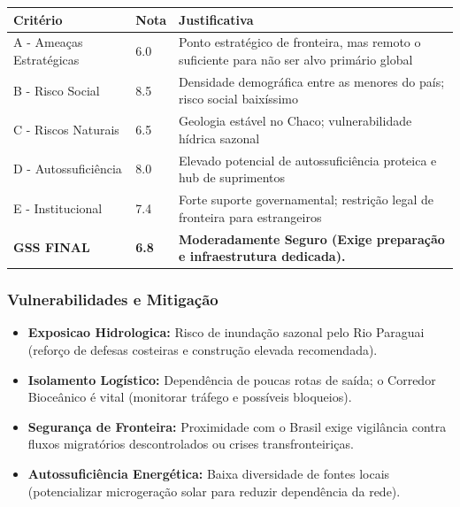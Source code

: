 \begin{table}[ht!]
\small \begin{tabular}{p{3.0cm}p{0.8cm}p{6.0cm}} \toprule
\textbf{Critério} & \textbf{Nota} & \textbf{Justificativa} \\ \midrule
A - Ameaças Estratégicas & 6.0 & Ponto estratégico de fronteira, mas remoto o suficiente para não ser alvo primário global \\
B - Risco Social & 8.5 & Densidade demográfica entre as menores do país; risco social baixíssimo \\
C - Riscos Naturais & 6.5 & Geologia estável no Chaco; vulnerabilidade hídrica sazonal \\
D - Autossuficiência & 8.0 & Elevado potencial de autossuficiência proteica e hub de suprimentos \\
E - Institucional & 7.4 & Forte suporte governamental; restrição legal de fronteira para estrangeiros \\
\midrule \textbf{GSS FINAL} & \textbf{6.8} & \textbf{Moderadamente Seguro (Exige preparação e infraestrutura dedicada).} \\ \bottomrule \end{tabular}
\end{table}
\subsubsection{Vulnerabilidades e
Mitigação}

\begin{itemize}
\tightlist
\item
  \textbf{Exposicao Hidrologica:} Risco de inundação sazonal pelo Rio
  Paraguai (reforço de defesas costeiras e construção elevada
  recomendada).
\item
  \textbf{Isolamento Logístico:} Dependência de poucas rotas de saída; o
  Corredor Bioceânico é vital (monitorar tráfego e possíveis bloqueios).
\item
  \textbf{Segurança de Fronteira:} Proximidade com o Brasil exige
  vigilância contra fluxos migratórios descontrolados ou crises
  transfronteiriças.
\item
  \textbf{Autossuficiência Energética:} Baixa diversidade de fontes
  locais (potencializar microgeração solar para reduzir dependência da
  rede).
\end{itemize}

